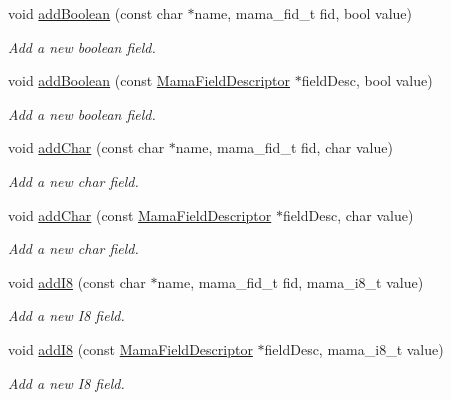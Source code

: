 \begin{DoxyCompactItemize}
void \hyperlink{classWombat_1_1MamaMsg_ab656fe99f4fbccfa1ec2c60a65227186}{addBoolean} (const char $\ast$name, mama\_\-fid\_\-t fid, bool value)
\begin{DoxyCompactList}\small\item\em Add a new boolean field. \item\end{DoxyCompactList}\item 
void \hyperlink{classWombat_1_1MamaMsg_a0bbe0eaea35407e761f2709248177494}{addBoolean} (const \hyperlink{classWombat_1_1MamaFieldDescriptor}{MamaFieldDescriptor} $\ast$fieldDesc, bool value)
\begin{DoxyCompactList}\small\item\em Add a new boolean field. \item\end{DoxyCompactList}\item 
void \hyperlink{classWombat_1_1MamaMsg_acc9f495c3524e4b5accd201a6c53dd01}{addChar} (const char $\ast$name, mama\_\-fid\_\-t fid, char value)
\begin{DoxyCompactList}\small\item\em Add a new char field. \item\end{DoxyCompactList}\item 
void \hyperlink{classWombat_1_1MamaMsg_acc9b9f7e3a9ebeaac5e46668375d8e6f}{addChar} (const \hyperlink{classWombat_1_1MamaFieldDescriptor}{MamaFieldDescriptor} $\ast$fieldDesc, char value)
\begin{DoxyCompactList}\small\item\em Add a new char field. \item\end{DoxyCompactList}\item 
void \hyperlink{classWombat_1_1MamaMsg_a94bf8801b1bc7b27bb2a619c5374814f}{addI8} (const char $\ast$name, mama\_\-fid\_\-t fid, mama\_\-i8\_\-t value)
\begin{DoxyCompactList}\small\item\em Add a new I8 field. \item\end{DoxyCompactList}\item 
void \hyperlink{classWombat_1_1MamaMsg_a42753a9caf37ece395f1f5c03410aff1}{addI8} (const \hyperlink{classWombat_1_1MamaFieldDescriptor}{MamaFieldDescriptor} $\ast$fieldDesc, mama\_\-i8\_\-t value)
\begin{DoxyCompactList}\small\item\em Add a new I8 field. \item\end{DoxyCompactList}\item 

\end{DoxyCompactItemize}

